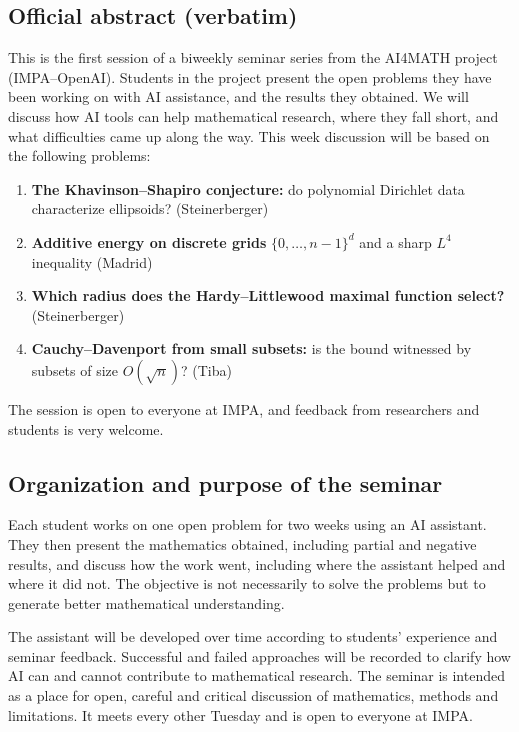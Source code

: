 \subsection{Official abstract (verbatim)}
\label{subsection-ai4math-abstract}
\noindent
This is the first session of a biweekly seminar series from the
AI4MATH project (IMPA--OpenAI). Students in the project present
the open problems they have been working on with AI assistance,
and the results they obtained. We will discuss how AI tools can
help mathematical research, where they fall short, and what
difficulties came up along the way. This week discussion will be
based on the following problems:

\begin{enumerate}
\item \textbf{The Khavinson--Shapiro conjecture:}
do polynomial Dirichlet data characterize ellipsoids?
(Steinerberger)
\item \textbf{Additive energy on discrete grids}
$\{0,\ldots,n-1\}^d$ and a sharp $L^4$ inequality (Madrid)
\item \textbf{Which radius does the Hardy--Littlewood maximal
function select?} (Steinerberger)
\item \textbf{Cauchy--Davenport from small subsets:}
is the bound witnessed by subsets of size $O(\sqrt{n})$? (Tiba)
\end{enumerate}

The session is open to everyone at IMPA, and feedback from
researchers and students is very welcome.

\subsection{Organization and purpose of the seminar}
\label{section-ai4math-format}
Each student works on one open problem for two weeks using an
AI assistant. They then present the mathematics obtained,
including partial and negative results, and discuss how the work
went, including where the assistant helped and where it did not.
The objective is not necessarily to solve the problems but to
generate better mathematical understanding.

The assistant will be developed over time according to students'
experience and seminar feedback. Successful and failed approaches
will be recorded to clarify how AI can and cannot contribute
to mathematical research. The seminar is intended as a place for
open, careful and critical discussion of mathematics, methods
and limitations. It meets every other Tuesday and is open to
everyone at IMPA.

